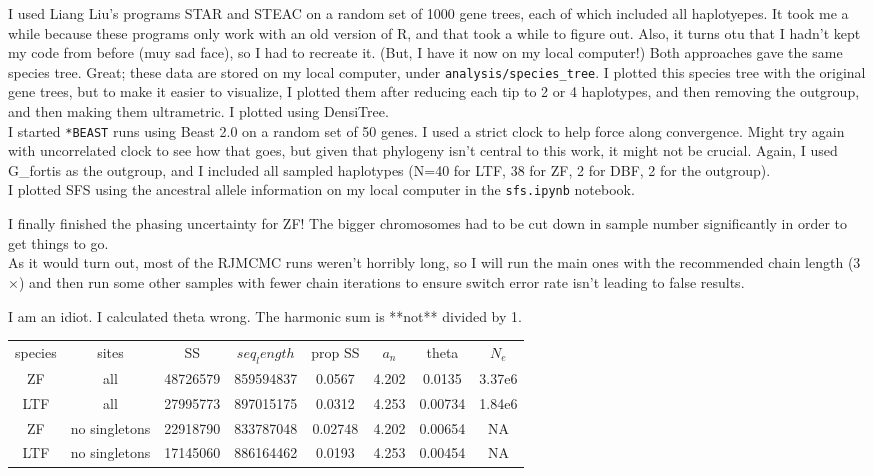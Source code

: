 \documentclass[idxtotoc,hyperref,openany,oneside]{labbook} %
\begin{document}
I used Liang Liu's programs STAR and STEAC on a random set of 1000 gene trees, each of which included all haplotyepes. It took me a while because these programs only work with an old version of R, and that took a while to figure out. Also, it turns otu that I hadn't kept my code from before (muy sad face), so I had to recreate it. (But, I have it now on my local computer!) Both approaches gave the same species tree. Great; these data are stored on my local computer, under \verb+analysis/species_tree+. I plotted this species tree with the original gene trees, but to make it easier to visualize, I plotted them after reducing each tip to 2 or 4 haplotypes, and then removing the outgroup, and then making them ultrametric. I plotted using DensiTree. \\

I started \verb+*BEAST+ runs using Beast 2.0 on a random set of 50 genes. I used a strict clock to help force along convergence. Might try again with uncorrelated clock to see how that goes, but given that phylogeny isn't central to this work, it might not be crucial. Again, I used G\_fortis as the outgroup, and I included all sampled haplotypes (N=40 for LTF, 38 for ZF, 2 for DBF, 2 for the outgroup). \\

I plotted SFS using the ancestral allele information on my local computer in the \verb+sfs.ipynb+ notebook.

I finally finished the phasing uncertainty for ZF! The bigger chromosomes had to be cut down in sample number significantly in order to get things to go. \\

As it would turn out, most of the RJMCMC runs weren't horribly long, so I will run the main ones with the recommended chain length (3$\times$) and then run some other samples with fewer chain iterations to ensure switch error rate isn't leading to false results.

I am an idiot. I calculated theta wrong. The harmonic sum is **not** divided by 1.
\begin{tabular}{ c c c c c c c c}
species & sites & SS & $seq_length$ & prop SS & $a_n$ & theta & $N_e$ \\
ZF  & all & 48726579 & 859594837 & 0.0567 & 4.202 & 0.0135 & 3.37e6 \\
LTF & all & 27995773 & 897015175 & 0.0312 & 4.253 & 0.00734 & 1.84e6 \\
ZF & no singletons & 22918790 & 833787048 & 0.02748 & 4.202 & 0.00654 & NA \\
LTF & no singletons & 17145060 & 886164462 & 0.0193 & 4.253 & 0.00454 & NA \\
\end{tabular} \\
\end{document}
